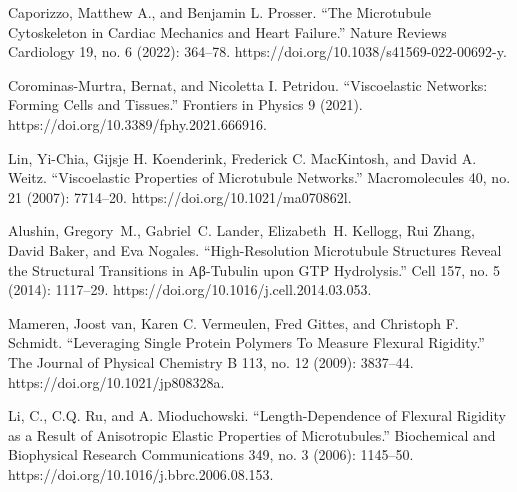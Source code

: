 \begin{thebibliography}{00}
Caporizzo, Matthew A., and Benjamin L. Prosser. “The Microtubule Cytoskeleton in Cardiac Mechanics and Heart Failure.” Nature Reviews Cardiology 19, no. 6 (2022): 364–78. https://doi.org/10.1038/s41569-022-00692-y. %


Corominas-Murtra, Bernat, and Nicoletta I. Petridou. “Viscoelastic Networks: Forming Cells and Tissues.” Frontiers in Physics 9 (2021). https://doi.org/10.3389/fphy.2021.666916. %

Lin, Yi-Chia, Gijsje H. Koenderink, Frederick C. MacKintosh, and David A. Weitz. “Viscoelastic Properties of Microtubule Networks.” Macromolecules 40, no. 21 (2007): 7714–20. https://doi.org/10.1021/ma070862l. %


\bibitem[]{}
Alushin, Gregory M., Gabriel C. Lander, Elizabeth H. Kellogg, Rui Zhang, David Baker, and Eva Nogales. “High-Resolution Microtubule Structures Reveal the Structural Transitions in Αβ-Tubulin upon GTP Hydrolysis.” Cell 157, no. 5 (2014): 1117–29. https://doi.org/10.1016/j.cell.2014.03.053. %


\bibitem[]{}
Mameren, Joost van, Karen C. Vermeulen, Fred Gittes, and Christoph F. Schmidt. “Leveraging Single Protein Polymers To Measure Flexural Rigidity.” The Journal of Physical Chemistry B 113, no. 12 (2009): 3837–44. https://doi.org/10.1021/jp808328a. %


\bibitem[]{}
Li, C., C.Q. Ru, and A. Mioduchowski. “Length-Dependence of Flexural Rigidity as a Result of Anisotropic Elastic Properties of Microtubules.” Biochemical and Biophysical Research Communications 349, no. 3 (2006): 1145–50. https://doi.org/10.1016/j.bbrc.2006.08.153. %


\end{thebibliography}
